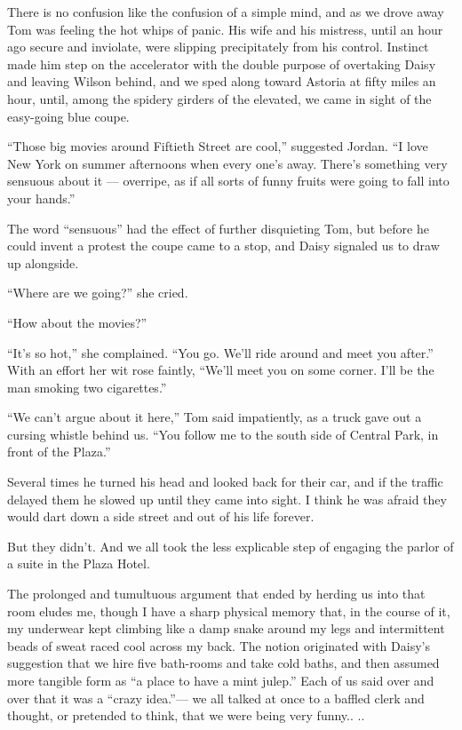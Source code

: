 \documentclass{znotebook}
\begin{document}
There is no confusion like the confusion of a simple mind, and as we drove away Tom was feeling the hot whips of panic. His wife and his mistress, until an hour ago secure and inviolate, were slipping precipitately from his control. Instinct made him step on the accelerator with the double purpose of overtaking Daisy and leaving Wilson behind, and we sped along toward Astoria at fifty miles an hour, until, among the spidery girders of the elevated, we came in sight of the easy-going blue coupe.

``Those big movies around Fiftieth Street are cool,'' suggested Jordan. ``I love New York on summer afternoons when every one’s away. There’s something very sensuous about it — overripe, as if all sorts of funny fruits were going to fall into your hands.''

The word ``sensuous'' had the effect of further disquieting Tom, but before he could invent a protest the coupe came to a stop, and Daisy signaled us to draw up alongside.

``Where are we going?'' she cried.

``How about the movies?''

``It’s so hot,'' she complained. ``You go. We’ll ride around and meet you after.'' With an effort her wit rose faintly, ``We’ll meet you on some corner. I’ll be the man smoking two cigarettes.''

``We can’t argue about it here,'' Tom said impatiently, as a truck gave out a cursing whistle behind us. ``You follow me to the south side of Central Park, in front of the Plaza.''

Several times he turned his head and looked back for their car, and if the traffic delayed them he slowed up until they came into sight. I think he was afraid they would dart down a side street and out of his life forever.

But they didn’t. And we all took the less explicable step of engaging the parlor of a suite in the Plaza Hotel.

The prolonged and tumultuous argument that ended by herding us into that room eludes me, though I have a sharp physical memory that, in the course of it, my underwear kept climbing like a damp snake around my legs and intermittent beads of sweat raced cool across my back. The notion originated with Daisy’s suggestion that we hire five bath-rooms and take cold baths, and then assumed more tangible form as ``a place to have a mint julep.'' Each of us said over and over that it was a ``crazy idea.''— we all talked at once to a baffled clerk and thought, or pretended to think, that we were being very funny.. ..
\end{document}

